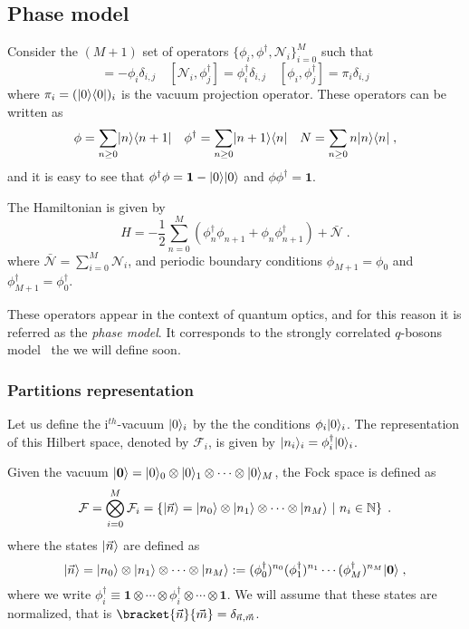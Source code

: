 \documentclass[a4paper,11pt]{amsart}
\begin{document}
\subsection{Phase model}
Consider the \((M+1)\) set of operators \(\{\phi_i,
\phi^\dagger,\mathcal{N}_i\}_{i=0}^M\) such that
\begin{equation}
 [\mathcal{N}_i, \phi_j] = - \phi_i \delta_{i,j} \quad
 [\mathcal{N}_i, \phi_j^\dagger] =  \phi_i^\dagger \delta_{i,j}  \quad 
 [\phi_i, \phi_j^\dagger] =  \pi_i \delta_{i,j}  
\end{equation}
where \(\pi_i =(\lvert0\rangle \langle0\rvert)_i\) is the vacuum projection operator.
These operators can be written as
\begin{equation}
\phi = \sum_{n\geq 0}\lvert n\rangle\langle n+1\rvert\quad 
\phi^\dagger = \sum_{n\geq 0}\lvert n+1\rangle\langle n\rvert \quad 
N = \sum_{n\geq 0}n\lvert n\rangle\langle n\rvert\; ,
\end{equation}
and it is easy to see that \(\phi^\dagger \phi = \bm{1} - \lvert0\rangle
\lvert0\rangle\) and \(\phi\phi^\dagger = \bm{1}\).

The Hamiltonian is given by
\begin{equation}
  H = - \frac{1}{2} \sum_{n =0}^M \left(\phi_n^\dagger \phi_{n+1}
  + \phi_n \phi_{n+1}^\dagger \right) + \bar{\mathcal{N}}\; .
\end{equation}
where \(\bar{\mathcal{N}} = \sum_{i=0}^M \mathcal{N}_i\), and
periodic boundary conditions \(\phi_{M+1} = \phi_0\) and
\(\phi_{M+1}^\dagger = \phi_0^\dagger\).

These operators appear in the context of quantum optics, and for
this reason it is referred as the \emph{phase model}. It 
corresponds to the strongly correlated \(q\)-bosons
model~\cite{Bogoliubov:1997soj} the we will define soon.

\subsubsection{Partitions representation}
Let us define the i\(^{th}\)-vacuum \(\lvert0\rangle_i\) by the the conditions 
\(\phi_i\lvert0\rangle_i\). The representation of this Hilbert space, denoted by
\(\mathcal{F}_i\), is given by \(\lvert n_i\rangle_i = \phi_i^\dagger \lvert0\rangle_i\). 

Given the vacuum \(\lvert\bm{0}\rangle = \lvert0\rangle_0\otimes \lvert0\rangle_1
\otimes \cdots \otimes  \lvert0\rangle_M\),
the Fock space is defined as 
\begin{equation}
  \mathcal{F} = \bigotimes_{i=0}^M \mathcal{F}_i = 
  \left\{\lvert\vec{n}\rangle = \lvert n_0\rangle\otimes \lvert n_1\rangle \otimes \cdots
  \otimes \lvert n_M\rangle \ | \ n_i \in \mathbb{N} \right\}\; .
\end{equation}
where the states \(\lvert\vec{n}\rangle\) are defined as 
\begin{equation}
  \lvert\vec{n}\rangle = \lvert n_0\rangle\otimes \lvert n_1\rangle \otimes \cdots \otimes \lvert n_M\rangle 
 : =  (\phi_0^\dagger)^{n_0} (\phi_1^\dagger)^{n_1} \cdots  (\phi_M^\dagger)^{n_M} \lvert\bm{0}\rangle \; ,
\end{equation}
where we write \(\phi_i^\dagger \equiv \bm{1} \otimes  \cdots \otimes
\phi_i^\dagger \otimes \cdots \otimes \bm{1}\).
We will assume that these states are normalized, that is
\(\bracket{\vec{n}}{\vec{m}}=\delta_{\vec{n}, \vec{m}}\). 
\end{document}
